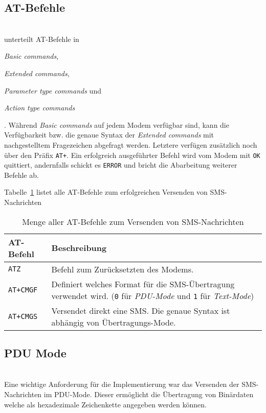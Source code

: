 \documentclass[paper=a4, fontsize=11pt]{scrartcl}
\begin{document}
\subsection{AT-Befehle}~\\
\cite{at-befehle} unterteilt AT-Befehle in 
	\begin{inparaenum}[1)]
		\item \textit{Basic commands}, 
		\item \textit{Extended commands}, 
		\item \textit{Parameter type commands} und  
		\item \textit{Action type commands}
	\end{inparaenum}. 
Während \textit{Basic commands} auf jedem Modem verfügbar sind, kann die Verfügbarkeit
bzw. die genaue Syntax der \textit{Extended commands} mit nachgestelltem Fragezeichen
abgefragt werden. Letztere verfügen zusätzlich noch über den Präfix \texttt{AT+}. 
Ein erfolgreich ausgeführter Befehl wird vom Modem mit \texttt{OK} quittiert, andernfalls
schickt es \texttt{ERROR} und bricht die Abarbeitung weiterer Befehle ab.

Tabelle~\ref{tab:at-befehle} listet alle AT-Befehle zum erfolgreichen
Versenden von SMS-Nachrichten\\

\begin{table}[H]
	\begin{tabularx}{\textwidth}{l|X}
		\textbf{AT-Befehl} & \textbf{Beschreibung} \\
		\hline
		\texttt{ATZ} & Befehl zum Zurücksetzten des Modems.\\
		\texttt{AT+CMGF} & Definiert welches Format für die SMS-Übertragung verwendet wird. (\texttt{0} für \textit{PDU-Mode} und \texttt{1} für \textit{Text-Mode})\\
		\texttt{AT+CMGS} & Versendet direkt eine SMS. Die genaue Syntax ist abhängig von Übertragungs-Mode. \\
	\end{tabularx}
	\caption{Menge aller AT-Befehle zum Versenden von SMS-Nachrichten}
	\label{tab:at-befehle}
\end{table}
\subsection{PDU Mode}~\\
Eine wichtige Anforderung für die Implementierung war das Versenden der SMS-Nachrichten
im PDU-Mode. Dieser ermöglicht die Übertragung von Binärdaten welche als hexadezimale Zeichenkette
angegeben werden können.
\end{document}
